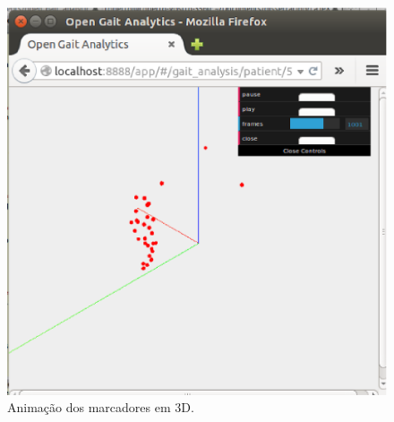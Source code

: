 \begin{figure}[ht]
\begin{minipage}[b]{0.32\textwidth}
  \end{minipage}
  \hfill
  \begin{minipage}[b]{0.32\textwidth}
    \includegraphics[width=\textwidth]{figuras/tela10.eps}
  \end{minipage}
  \caption{Animação dos marcadores em 3D.}
  \label{animacao1}
\end{figure}


